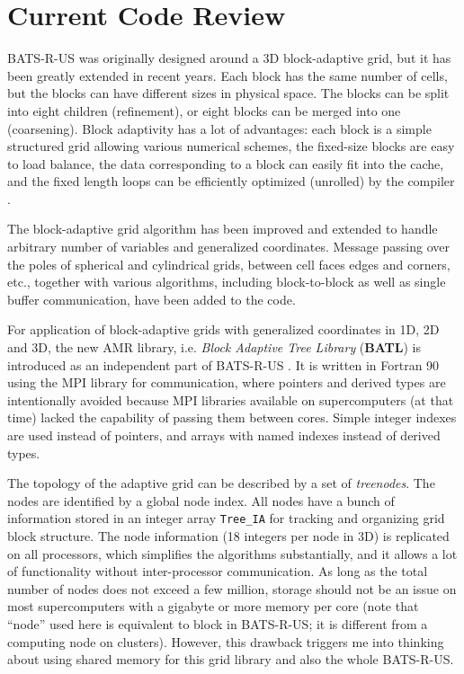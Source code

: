 \documentclass[fleqn,11pt]{SelfArx} %
\begin{document}
\section{Current Code Review}

BATS-R-US was originally designed around a 3D block-adaptive grid, but it has been greatly extended in recent years. 
Each block has the same number of cells, but the blocks can have different sizes in physical space. The blocks can be split into eight children (refinement), or eight blocks can be merged into one (coarsening). Block adaptivity has a lot of advantages: each block is a simple structured grid allowing various numerical schemes, the fixed-size blocks are easy to load balance, the data corresponding to a block can easily fit into the cache, and the fixed length loops can be efficiently optimized (unrolled) by the compiler \cite{stout1997adaptive}. 

The block-adaptive grid algorithm has been improved and extended to handle arbitrary number of variables and generalized coordinates. Message passing over the poles of spherical and cylindrical grids, between cell faces edges and corners, etc., together with various algorithms, including block-to-block as well as single buffer communication, have been added to the code.

For application of block-adaptive grids with generalized coordinates in 1D, 2D and 3D, the new AMR library, i.e. \emph{Block Adaptive Tree Library} (\textbf{BATL}) is introduced as an independent part of BATS-R-US  \cite{toth2012adaptive}. It is written in Fortran 90 using the MPI library for communication, where pointers and derived types are intentionally avoided because MPI libraries available on supercomputers (at that time) lacked the capability of passing them between cores. Simple integer indexes are used instead of pointers, and arrays with named indexes instead of derived types. 

The topology of the adaptive grid can be described by a set of \emph{treenodes}. The nodes are identified by a global node index. All nodes have a bunch of information stored in an integer array \verb|Tree_IA| for tracking and organizing grid block structure. The node information (18 integers per node in 3D) is replicated on all processors, which simplifies the algorithms substantially, and it allows a lot of functionality without inter-processor communication. As long as the total number of nodes does not exceed a few million, storage should not be an issue on most supercomputers with a gigabyte or more memory per core (note that ``node'' used here is equivalent to block in BATS-R-US; it is different from a computing node on clusters). However, this drawback triggers me into thinking about using shared memory for this grid library and also the whole BATS-R-US.
\end{document}
